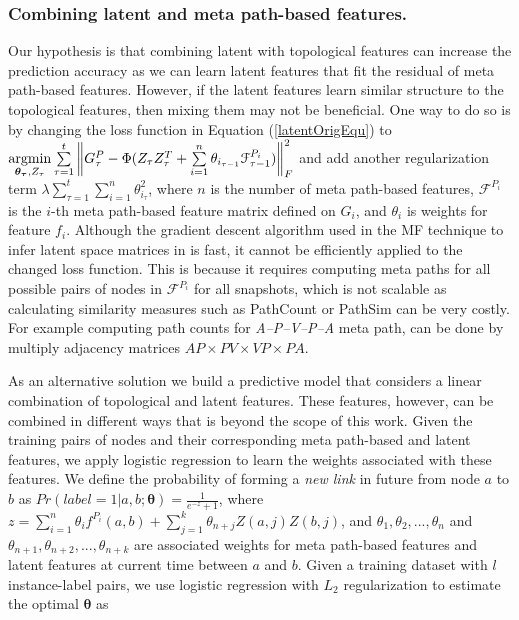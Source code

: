 \subsubsection{Combining latent and meta path-based features.}
Our hypothesis is that combining latent with topological features can increase the prediction accuracy as we can learn latent features that fit the residual of meta path-based features. However, if the latent features learn similar structure to the topological features, then mixing them may not be beneficial. One way to do so is by changing the loss function in Equation (\ref{latentOrigEqu}) to $\operatorname*{argmin}\limits_{\boldsymbol{\theta_\tau},Z_\tau}\sum\limits_{\tau=1}^{t}\left \| G^P_\tau - \Phi(Z_{\tau}Z_{\tau}^T + \sum\limits_{i=1}^{n}\theta_{i_{\tau-1}} \mathcal{F}^{P_i}_{\tau-1}) \right \|^2_F$ and add another regularization term $\lambda \sum\limits_{\tau=1}^{t} \sum\limits_{i=1}^{n} \theta_{i_\tau}^2$, where $n$ is the number of meta path-based features, $\mathcal{F}^{P_i}$ is the $i$-th meta path-based feature matrix defined on $G_i$, and $\theta_i$ is weights for feature $f_i$. Although the gradient descent algorithm used in the MF technique to infer latent space matrices in \cite{Zhu2016} is fast, it cannot be efficiently applied to the changed loss function. This is because it requires computing meta paths for all possible pairs of nodes in $\mathcal{F}^{P_i}$ for all snapshots, which is not scalable as calculating similarity measures such as PathCount or PathSim can be very costly. For example computing path counts for \textit{A--P--V--P--A} meta path, can be done by multiply adjacency matrices $AP\times PV\times VP\times PA$. 


As an alternative solution we build a predictive model that considers a linear combination of topological and latent features. These features, however, can be combined in different ways that is beyond the scope of this work. Given the training pairs of nodes and their corresponding meta path-based and latent features, we apply logistic regression to learn the weights associated with these features. We define the probability of forming a \textit{new link} in future from node $a$ to $b$ as %
 $Pr(label=1|a, b; \boldsymbol{\theta}) = \frac{1}{e^{-z}+1}$, where $z=\sum\limits_{i=1}^{n}\theta_i f^{P_i}(a,b) + \sum\limits_{j=1}^{k} \theta_{n+j}Z(a,j)Z(b,j)$, and $\theta_1,\theta_2,..., \theta_n$ and $\theta_{n+1},\theta_{n+2},..., \theta_{n+k}$ are associated weights for meta path-based features and latent features at current time between $a$ and $b$. Given a training dataset with $l$ instance-label pairs, we use logistic regression with $L_2$ regularization to estimate the optimal $\boldsymbol{\theta}$ as%

